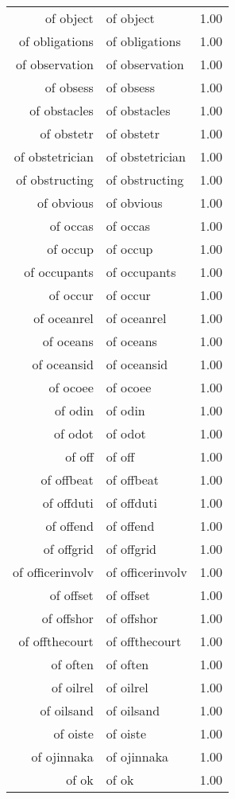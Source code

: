 \begin{table}[ht]
\begin{tabular}{rlr}
  of object & of object & 1.00 \\ 
  of obligations & of obligations & 1.00 \\ 
  of observation & of observation & 1.00 \\ 
  of obsess & of obsess & 1.00 \\ 
  of obstacles & of obstacles & 1.00 \\ 
  of obstetr & of obstetr & 1.00 \\ 
  of obstetrician & of obstetrician & 1.00 \\ 
  of obstructing & of obstructing & 1.00 \\ 
  of obvious & of obvious & 1.00 \\ 
  of occas & of occas & 1.00 \\ 
  of occup & of occup & 1.00 \\ 
  of occupants & of occupants & 1.00 \\ 
  of occur & of occur & 1.00 \\ 
  of oceanrel & of oceanrel & 1.00 \\ 
  of oceans & of oceans & 1.00 \\ 
  of oceansid & of oceansid & 1.00 \\ 
  of ocoee & of ocoee & 1.00 \\ 
  of odin & of odin & 1.00 \\ 
  of odot & of odot & 1.00 \\ 
  of off & of off & 1.00 \\ 
  of offbeat & of offbeat & 1.00 \\ 
  of offduti & of offduti & 1.00 \\ 
  of offend & of offend & 1.00 \\ 
  of offgrid & of offgrid & 1.00 \\ 
  of officerinvolv & of officerinvolv & 1.00 \\ 
  of offset & of offset & 1.00 \\ 
  of offshor & of offshor & 1.00 \\ 
  of offthecourt & of offthecourt & 1.00 \\ 
  of often & of often & 1.00 \\ 
  of oilrel & of oilrel & 1.00 \\ 
  of oilsand & of oilsand & 1.00 \\ 
  of oiste & of oiste & 1.00 \\ 
  of ojinnaka & of ojinnaka & 1.00 \\ 
  of ok & of ok & 1.00 \\ 

\end{tabular}
\end{table}
